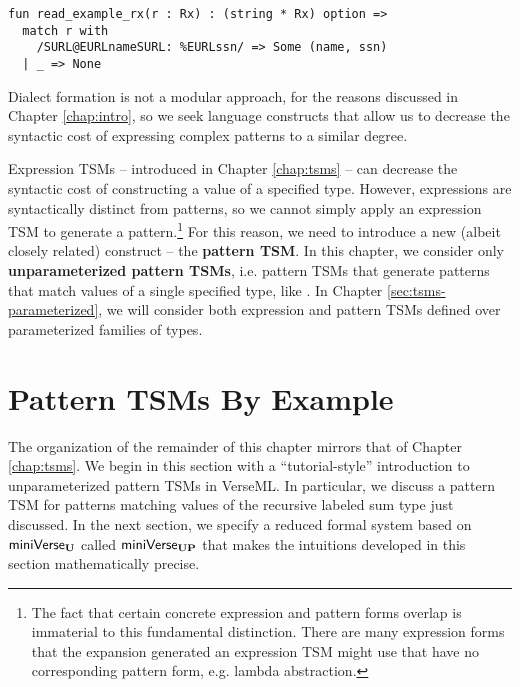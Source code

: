 \begin{lstlisting}
fun read_example_rx(r : Rx) : (string * Rx) option => 
  match r with 
    /SURL@EURLnameSURL: %EURLssn/ => Some (name, ssn)
  | _ => None\end{lstlisting}
\noindent
Dialect formation is not a modular approach, for the reasons discussed in Chapter \ref{chap:intro}, so we seek language constructs that allow us to decrease the syntactic cost of expressing complex patterns to a similar degree.

Expression TSMs -- introduced in Chapter \ref{chap:tsms} -- can decrease the syntactic cost of constructing a value of a specified type. However, expressions are syntactically distinct from patterns, so we cannot simply apply an expression TSM to generate a pattern.\footnote{The fact that certain concrete expression and pattern forms overlap is immaterial to this fundamental distinction. There are many expression forms that the expansion generated an expression TSM might use that have no corresponding pattern form, e.g.  lambda abstraction.} %
For this reason, we need to introduce a new (albeit closely related) construct -- the \textbf{pattern TSM}. In this chapter, we consider only \textbf{unparameterized pattern TSMs}, i.e. pattern TSMs that generate patterns that match values of a single specified type, like . In Chapter \ref{sec:tsms-parameterized}, we will consider both expression and pattern TSMs defined over parameterized families of types. 

\section{Pattern TSMs By Example}\label{sec:ptsms-by-example}
The organization of the remainder of this chapter mirrors that of Chapter \ref{chap:tsms}. We begin in this section with a ``tutorial-style'' introduction to unparameterized pattern TSMs in VerseML. In particular, we  discuss a pattern TSM for patterns matching values of the recursive labeled sum type  just discussed. In the next section, we specify a reduced formal system based on $\mathsf{miniVerse}_\textbf{U}$ called $\mathsf{miniVerse}_\textbf{UP}$ that makes the intuitions developed in this section mathematically precise.


